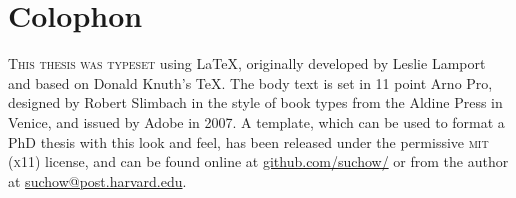 \chapter*{Colophon}

\begin{center}
\parbox{200pt}{\raggedright\lettrine[lines=3,slope=-2pt,nindent=-4pt]{\textcolor{hitachi}{T}}{his thesis was typeset} using \LaTeX, originally developed by Leslie Lamport and based on Donald Knuth's \TeX. The body text is set in 11 point Arno Pro, designed by Robert Slimbach in the style of book types from the Aldine Press in Venice, and issued by Adobe in 2007. A template, which can be used to format a PhD thesis with this look and feel, has been released under the permissive \textsc{mit} (\textsc{x}11) license, and can be found online at \href{https://github.com/suchow/}{github.com/suchow/} or from the author at \href{mailto:suchow@fas.harvard.edu}{suchow@post.harvard.edu}.
}
\end{center}